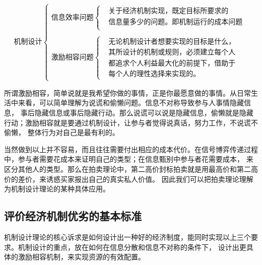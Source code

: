 \documentclass[12pt, a4paper]{article} %
\begin{document}
\begin{CJK*}{UTF8}{gbsn}
        \[
            \text{机制设计}
            \begin{cases}
                 \text{信息效率问题}\left\{
                    \begin{aligned}
                        &\text{关于经济机制实现，既定目标所要求的}  \\
                        &\text{信息量多少的问题。即机制运行的成本问题} \\
                    \end{aligned}
                 \right. \\\\
                 \text{激励相容问题}\left\{
                    \begin{aligned}
                        &\text{无论机制设计者想要实现的目标是什么，}  \\
                        &\text{其所设计的机制或规则，必须建立每个人} \\
                        &\text{都追求个人利益最大化的前提下，借助于}  \\
                        &\text{每个人的理性选择来实现的。}
                    \end{aligned}
                 \right.
            \end{cases}
        \]

        所谓激励相容，简单说就是我希望你做的事情，正是你最愿意做的事情。从日常生活中来看，可以简单理解为说谎和偷懒问题。信息不对称导致参与人事情隐藏信息，
        事后隐藏信息或事后隐藏行动。那么说谎可以说是隐藏信息，偷懒就是隐藏行动；激励相容就是要通过机制设计，让参与者觉得说真话，努力工作，不说谎不偷懒，
        整体行为对自己是最有利的。 \par

        当然做到以上并不容易，而且往往需要付出相应的成本代价。在信号博弈传递过程中，参与者需要花成本来证明自己的类型；在信息甄别中参与者花需要成本，
        来区分其他人的类型。那么在拍卖理论中，第二高价封标拍卖就是用最高价和第二高价的差价，来诱惑买家报出自己的真实私人价值。
        因此我们可以把拍卖理论理解为机制设计理论的某种具体应用。 \par

        \subsection{评价经济机制优劣的基本标准}

        机制设计理论的核心诉求是如何设计出一种好的经济制度，能同时实现以上三个要求。机制设计的重点，放在如何在信息分散和信息不对称的条件下，
        设计出更具体的激励相容机制，来实现资源的有效配置。


\end{CJK*}
\end{document}
